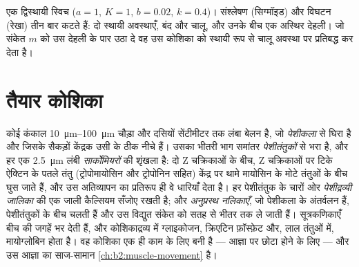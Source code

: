 \begin{omfigure}

{\small एक द्विस्थायी स्विच ($a = 1$, $K = 1$, $b = 0.02$, $k = 0.4$)।
संश्लेषण (सिग्मॉइड) और विघटन (रेखा) तीन बार कटते हैं: दो
स्थायी अवस्थाएँ, बंद और चालू, और उनके बीच एक अस्थिर देहली।
जो संकेत $m$ को उस देहली के पार उठा दे वह उस कोशिका को स्थायी रूप से
चालू अवस्था पर प्रतिबद्ध कर देता है।}
\end{omfigure}

\section{तैयार कोशिका}

\begin{definition}[पेशी तंतु]\label{def:b2:cell-differentiation:fibre}
कोई कंकाल  \qtyrange{10}{100}{\micro m}
चौड़ा और दसियों सेंटीमीटर तक लंबा बेलन है, जो
\emph{पेशीकला} से घिरा है और जिसके सैकड़ों केंद्रक उसी के ठीक नीचे हैं।
उसका भीतरी भाग समांतर \emph{पेशीतंतुकों} से भरा है, और हर एक
\qty{2.5}{\micro m} लंबी \emph{सार्कोमियरों} की शृंखला है: दो Z चक्रिकाओं
के बीच, Z चक्रिकाओं पर टिके ऐक्टिन के पतले तंतु (ट्रोपोमायोसिन और
ट्रोपोनिन सहित) केंद्र पर थामे मायोसिन के मोटे तंतुओं के बीच घुस जाते
हैं, और उस अतिव्यापन का प्रतिरूप ही वे धारियाँ देता है। हर
पेशीतंतुक के चारों ओर \emph{पेशीद्रव्यी जालिका} की एक जाली कैल्सियम
सँजोए रखती है; और \emph{अनुप्रस्थ नलिकाएँ}, जो पेशीकला के अंतर्वलन हैं,
पेशीतंतुकों के बीच चलती हैं और उस विद्युत संकेत को सतह से भीतर तक ले
जाती हैं। सूत्रकणिकाएँ बीच की जगहें भर देती हैं, और
कोशिकाद्रव्य में ग्लाइकोजन, क्रिएटिन फ़ॉस्फ़ेट और, लाल तंतुओं में,
मायोग्लोबिन होता है। वह कोशिका एक ही काम के लिए बनी है --- आज्ञा पर
छोटा होने के लिए --- और उस आज्ञा का साज-सामान
\cref{ch:b2:muscle-movement} है।
\end{definition}


